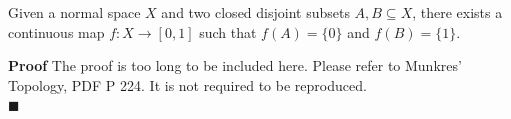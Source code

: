 \documentclass[main.tex]{subfiles}
\begin{document}
\begin{lemma}
    Given a normal space $X$ and two closed disjoint subsets $A, B \subseteq X$, there exists a continuous map $f: X \to [0, 1]$ such that $f(A) = \{0\}$ and $f(B) = \{1\}$.
\end{lemma}
\par \noindent \textbf{Proof} The proof is too long to be included here. Please refer to Munkres' Topology, PDF P 224. It is not required to be reproduced. 
\mbox{} \\ \null \hfill $\blacksquare$ 
\end{document}
